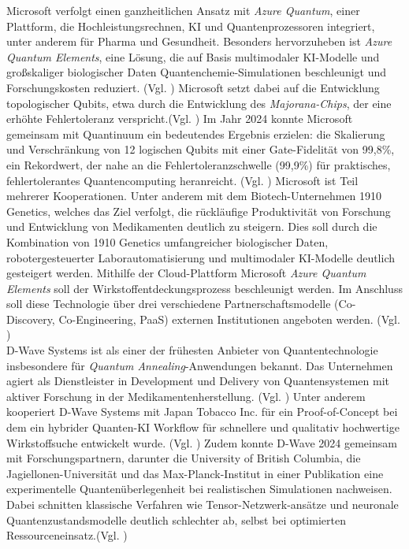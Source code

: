 Microsoft verfolgt einen ganzheitlichen Ansatz mit \textit{Azure Quantum}, einer Plattform, die Hochleistungsrechnen, KI und Quantenprozessoren integriert, unter anderem für Pharma und Gesundheit. Besonders hervorzuheben ist \textit{Azure Quantum Elements}, eine Lösung, die auf Basis multimodaler KI-Modelle und großskaliger biologischer Daten Quantenchemie-Simulationen beschleunigt und Forschungskosten reduziert. (Vgl. \cite{buntzMicrosoftEyesQuantum2023}) 
Microsoft setzt dabei auf die Entwicklung topologischer Qubits, etwa durch die Entwicklung des \textit{Majorana-Chips}, der eine erhöhte Fehlertoleranz verspricht.(Vgl. \cite{aasenRoadmapFaultTolerant2025, aghaeeInterferometricSingleshotParity2025}) 
Im Jahr 2024 konnte Microsoft gemeinsam mit Quantinuum ein bedeutendes Ergebnis erzielen: die Skalierung und Verschränkung von 12 logischen Qubits mit einer Gate-Fidelität von 99,8\%, ein Rekordwert, der nahe an die Fehlertoleranzschwelle (99,9\%) für praktisches, fehlertolerantes Quantencomputing heranreicht. (Vgl. \cite{reichardtDemonstrationQuantumComputation2024}) 
Microsoft ist Teil mehrerer Kooperationen. Unter anderem mit dem Biotech-Unternehmen 1910 Genetics, welches das Ziel verfolgt, die rückläufige Produktivität von Forschung und Entwicklung von  Medikamenten deutlich zu steigern. Dies soll durch die Kombination von 1910 Genetics umfangreicher biologischer Daten, robotergesteuerter Laborautomatisierung und multimodaler KI-Modelle deutlich gesteigert werden. Mithilfe der Cloud-Plattform Microsoft \textit{Azure Quantum Elements} soll der Wirkstoffentdeckungsprozess beschleunigt werden. Im Anschluss soll diese Technologie über drei verschiedene Partnerschaftsmodelle (Co-Discovery, Co-Engineering, PaaS) externen Institutionen angeboten werden. (Vgl. \cite{alamMicrosoft1910Genetics2024})\\

D-Wave Systems ist als einer der frühesten Anbieter von Quantentechnologie insbesondere für  \textit{Quantum Annealing}-Anwendungen bekannt. Das Unternehmen agiert als Dienstleister in Development und Delivery von Quantensystemen mit aktiver Forschung in der Medikamentenherstellung. (Vgl. \cite{flahertyDWaveLooksLarge2024}) 
Unter anderem kooperiert D-Wave Systems mit Japan Tobacco Inc. für ein Proof-of-Concept bei dem ein hybrider Quanten-KI Workflow für schnellere und qualitativ hochwertige Wirkstoffsuche entwickelt wurde. (Vgl. \cite{JapanTobaccoInc2024})
Zudem konnte D-Wave 2024 gemeinsam mit Forschungspartnern, darunter die University of British Columbia, die Jagiellonen-Universität und das Max-Planck-Institut in einer Publikation eine experimentelle Quantenüberlegenheit bei realistischen Simulationen nachweisen. Dabei schnitten klassische Verfahren wie Tensor-Netzwerk-ansätze und neuronale Quantenzustandsmodelle deutlich schlechter ab, selbst bei optimierten Ressourceneinsatz.(Vgl. \cite{kingComputationalSupremacyQuantum2024})\\

